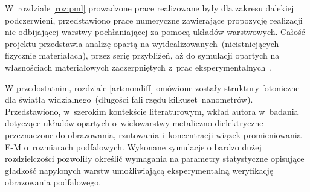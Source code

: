 W~rozdziale \ref{roz:pml} prowadzone prace realizowane były dla zakresu dalekiej podczerwieni, przedstawiono prace numeryczne zawierające propozycję realizacji nie odbijającej warstwy pochłaniającej za pomocą układów warstwowych. Całość projektu przedstawia analizę opartą na wyidealizowanych~(nieistniejących fizycznie materiałach), przez serię przybliżeń, aż do symulacji opartych na własnościach materiałowych zaczerpniętych z~prac eksperymentalnych~\cite{ania2015,stefaniuk2015perfectly}.

W przedostatnim,  rozdziale \ref{art:nondiff}  omówione zostały struktury fotoniczne dla światła widzialnego~(długości fali rzędu kilkuset~nanometrów). Przedstawiono, w~szerokim kontekście literaturowym, wkład autora w~badania dotyczące układów opartych o~wielowarstwy metaliczno-dielektryczne przeznaczone do obrazowania, rzutowania i~koncentracji wiązek promieniowania E-M o~rozmiarach podfalowych. Wykonane symulacje o bardzo dużej rozdzielczości pozwoliły określić wymagania na parametry statystyczne opisujące gładkość napylonych warstw umożliwiającą eksperymentalną weryfikację obrazowania podfalowego.

